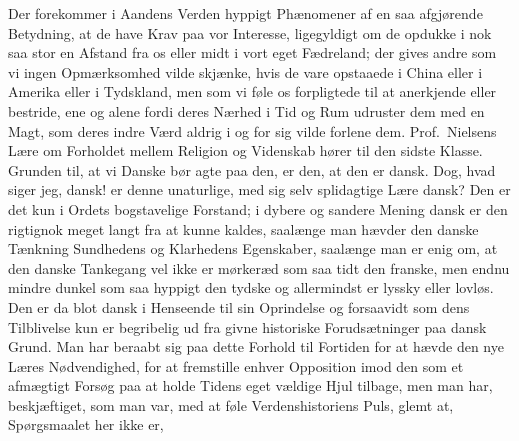 Der forekommer i Aandens Verden hyppigt Phænomener af en saa afgjørende
Betydning, at de have Krav paa vor Interesse, ligegyldigt om de opdukke i nok
saa stor en Afstand fra os eller midt i vort eget
Fædreland; der gives andre som vi ingen Opmærksomhed vilde skjænke,
hvis de vare opstaaede i China eller i Amerika eller i Tydskland, men som vi
føle os forpligtede til at anerkjende eller bestride, ene og alene fordi deres
Nærhed i Tid og Rum udruster dem med en Magt, som deres indre Værd aldrig i og
for sig vilde forlene dem. Prof.\ Nielsens Lære om Forholdet mellem Religion
og Videnskab hører til den sidste Klasse. Grunden til, at vi Danske bør agte
paa den, er den, at den er dansk. Dog, hvad siger jeg, dansk! er denne
unaturlige, med sig selv splidagtige Lære dansk? Den er det kun i Ordets
bogstavelige Forstand; i dybere og sandere Mening dansk er den rigtignok meget
langt fra at kunne kaldes, saalænge man hævder den danske Tænkning Sundhedens
og Klarhedens Egenskaber, saalænge man er enig om, at den danske Tankegang vel
ikke er mørkeræd som saa tidt den franske, men endnu mindre dunkel som saa
hyppigt den tydske og allermindst er lyssky eller lovløs. Den er da blot dansk
i Henseende til sin Oprindelse og forsaavidt som dens Tilblivelse kun er
begribelig ud fra givne historiske Forudsætninger paa dansk Grund. Man har
beraabt sig paa dette Forhold til Fortiden for at hævde den nye Læres
Nødvendighed, for at fremstille enhver Opposition imod den som et afmægtigt
Forsøg paa at holde Tidens eget vældige Hjul tilbage, men man har,
beskjæftiget, som man var, med at føle Verdenshistoriens Puls, glemt at,
Spørgsmaalet her ikke er,

